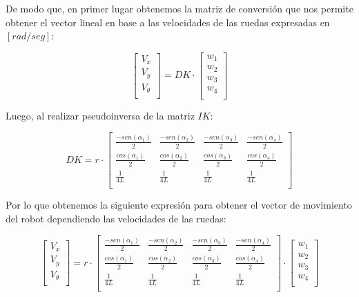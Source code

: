 De modo que, en primer lugar obtenemos la matriz de conversión que nos permite obtener el vector lineal en base a las velocidades de las ruedas expresadas en $[rad/seg]$:

$$ \begin{bmatrix} V_x \\ V_y \\ V_\theta \\ \end{bmatrix} = DK \cdot \begin{bmatrix} w_1 \\ w_2 \\ w_3 \\ w_4 \\ \end{bmatrix} $$

Luego, al realizar pseudoinversa de la matriz $IK$:

$$  DK = 
    r
    \cdot 
    \begin{bmatrix}
        {\frac{-sen(\alpha_1)}{2}} & {\frac{-sen(\alpha_2)}{2}} & {\frac{-sen(\alpha_3)}{2}} & {\frac{-sen(\alpha_4)}{2}} \\
        {\frac{cos(\alpha_1)}{2}}  & {\frac{cos(\alpha_2)}{2}}  & {\frac{cos(\alpha_3)}{2}}  & {\frac{cos(\alpha_4)}{2}}  \\
        {\frac{1}{4L}}  & {\frac{1}{4L}}  & {\frac{1}{4L}}  & {\frac{1}{4L}}  \\
    \end{bmatrix} $$

Por lo que obtenemos la siguiente expresión para obtener el vector de movimiento del robot dependiendo las velocidades de las ruedas:

$$ \begin{bmatrix} V_x \\ V_y \\ V_\theta \\ \end{bmatrix} = 
    r
    \cdot 
    \begin{bmatrix}
        {\frac{-sen(\alpha_1)}{2}} & {\frac{-sen(\alpha_2)}{2}} & {\frac{-sen(\alpha_3)}{2}} & {\frac{-sen(\alpha_4)}{2}} \\
        {\frac{cos(\alpha_1)}{2}}  & {\frac{cos(\alpha_2)}{2}}  & {\frac{cos(\alpha_3)}{2}}  & {\frac{cos(\alpha_4)}{2}}  \\
        {\frac{1}{4L}}  & {\frac{1}{4L}}  & {\frac{1}{4L}}  & {\frac{1}{4L}}  \\
    \end{bmatrix}
    \cdot
    \begin{bmatrix} w_1 \\ w_2 \\ w_3 \\ w_4 \\ \end{bmatrix} $$

